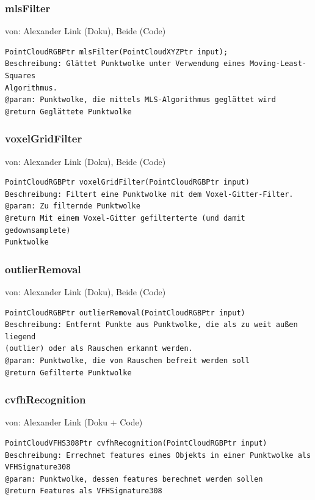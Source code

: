 \documentclass{suturo}
\makeatletter
\newcommand{\chapterauthor}[1]{%
  {\parindent0pt\vspace*{-27pt}%
  \linespread{0}\small\begin{flushright}von: #1\end{flushright}%
  \par\nobreak\vspace*{0pt}}
  \@afterheading%
}
\makeatother
\begin{document}
\subsubsection{mlsFilter}
\chapterauthor{Alexander Link (Doku), Beide (Code)}
\begin{verbatim}
PointCloudRGBPtr mlsFilter(PointCloudXYZPtr input);
Beschreibung: Glättet Punktwolke unter Verwendung eines Moving-Least-Squares
Algorithmus.
@param: Punktwolke, die mittels MLS-Algorithmus geglättet wird
@return Geglättete Punktwolke
\end{verbatim}\label{func:mlsfilter}

\subsubsection{voxelGridFilter}
\chapterauthor{Alexander Link (Doku), Beide (Code)}
\begin{verbatim}
PointCloudRGBPtr voxelGridFilter(PointCloudRGBPtr input)
Beschreibung: Filtert eine Punktwolke mit dem Voxel-Gitter-Filter.
@param: Zu filternde Punktwolke
@return Mit einem Voxel-Gitter gefilterterte (und damit gedownsamplete)
Punktwolke
\end{verbatim}\label{func:voxelgridfilter}

\subsubsection{outlierRemoval}
\chapterauthor{Alexander Link (Doku), Beide (Code)}
\begin{verbatim}
PointCloudRGBPtr outlierRemoval(PointCloudRGBPtr input)
Beschreibung: Entfernt Punkte aus Punktwolke, die als zu weit außen liegend
(outlier) oder als Rauschen erkannt werden.
@param: Punktwolke, die von Rauschen befreit werden soll
@return Gefilterte Punktwolke
\end{verbatim}\label{func:outlierremoval}

\subsubsection{cvfhRecognition}
\chapterauthor{Alexander Link (Doku + Code)}
\begin{verbatim}
PointCloudVFHS308Ptr cvfhRecognition(PointCloudRGBPtr input)
Beschreibung: Errechnet features eines Objekts in einer Punktwolke als
VFHSignature308
@param: Punktwolke, dessen features berechnet werden sollen
@return Features als VFHSignature308
\end{verbatim}\label{func:cvfhRecognition}
\end{document}
